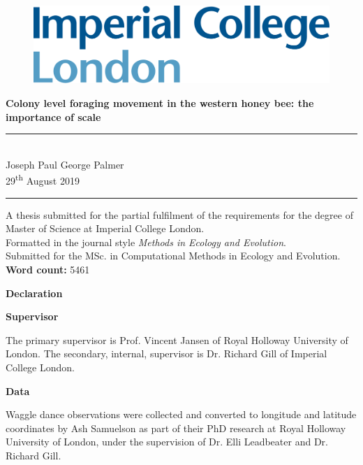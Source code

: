 \documentclass[11pt,usenames,dvipsnames,a4paper]{article}
\begin{document}
\begin{titlepage}

\begin{figure}[H]
	\includegraphics[scale=0.13]{../Poster/Images/ICL_Logo.png}
\end{figure}
\vfill
\begin{center}
\noindent
\huge{
\textbf{Colony level foraging movement in the western honey bee: the importance of scale}
}\\[1.5cm]
\noindent\rule{\textwidth}{0.05pt}\\[0.2cm]
\noindent
\Large{
	Joseph Paul George Palmer\\
	29\textsuperscript{th} August 2019
}\\

\noindent\rule{\textwidth}{0.05pt}
\vfill\vfill\vfill
\large{A thesis submitted for the partial fulfilment of the requirements for the degree of Master of Science at Imperial College London.\\[0.5cm]
	Formatted in the journal style \textit{Methods in Ecology and Evolution}.\\
	Submitted for the MSc. in Computational Methods in Ecology and Evolution.\\[1.5cm]
	\textbf{Word count:} 5461
}\\
\vfill\vfill
\end{center}

\end{titlepage}

\newpage

\begin{center}
	\Large{\textbf{Declaration}}
\end{center}
\noindent
\Large{\textbf{Supervisor}}

\noindent
The primary supervisor is Prof. Vincent Jansen of Royal Holloway University of London. The secondary, internal, supervisor is Dr. Richard Gill of Imperial College London.

\noindent
\Large{\textbf{Data}}

\noindent
Waggle dance observations were collected and converted to longitude and latitude coordinates by Ash Samuelson as part of their PhD research at Royal Holloway University of London, under the supervision of Dr. Elli Leadbeater and Dr. Richard Gill.
\end{document}
